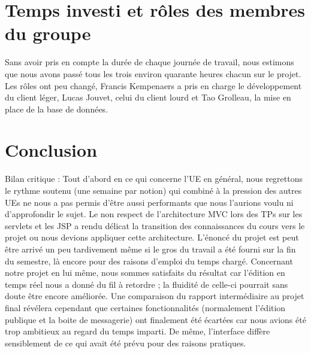 \documentclass[a4paper, 12pt]{article}
\begin{document}
\section{Temps investi et rôles des membres du groupe}

Sans avoir pris en compte la durée de chaque journée de travail, nous estimons que nous avons passé tous les trois environ quarante heures chacun sur le projet.
Les rôles ont peu changé, Francis Kempenaers a pris en charge le développement du client léger, Lucas Jouvet, celui du client lourd et Tao Grolleau, la mise en place de la base de données. 

\section{Conclusion}

Bilan critique : Tout d'abord en ce qui concerne l'UE en général, nous regrettons le rythme soutenu (une semaine par notion) qui combiné à la pression des autres UEs ne nous a pas permis d'être aussi performants que nous l'aurions voulu ni d'approfondir le sujet. Le non respect de l'architecture MVC lors des TPs sur les servlets et les JSP a rendu délicat la transition des connaissances du cours vers le projet ou nous devions appliquer cette architecture. L'énoncé du projet est peut être arrivé un peu tardivement même si le gros du travail a été fourni sur la fin du semestre, là encore pour des raisons d'emploi du temps chargé.
Concernant notre projet en lui même, nous sommes satisfaits du résultat car l'édition en temps réel nous a donné du fil à retordre ; la fluidité de celle-ci pourrait sans doute être encore améliorée. Une comparaison du rapport intermédiaire au projet final révélera cependant que certaines fonctionnalités (normalement l'édition publique et la boite de messagerie) ont finalement été écartées car nous avions été trop ambitieux au regard du temps imparti. De même, l'interface diffère sensiblement de ce qui avait été prévu pour des raisons pratiques.
\end{document}
